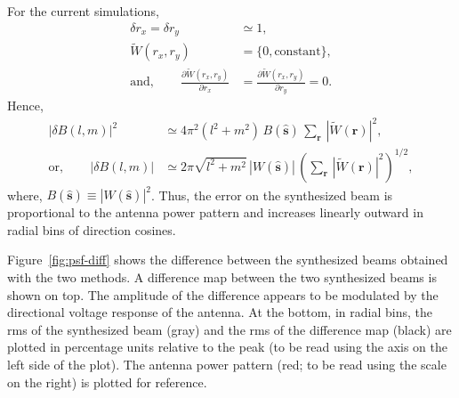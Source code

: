 \documentclass[a4paper,fleqn,usenatbib]{../mnras}
\begin{document}
For the current simulations, 
\begin{align}
  \delta r_x = \delta r_y &\simeq 1, \\
  \widetilde{W}(r_x,r_y) &= \{0, \textrm{constant}\}, \\
  \textrm{and},\qquad \frac{\partial{\widetilde{W}(r_x,r_y)}}{\partial{r_x}} &= \frac{\partial{\widetilde{W}(r_x,r_y)}}{\partial{r_y}} = 0.
\end{align}
Hence,
\begin{align}
  \left|\delta B(l,m)\right|^2 &\simeq 4\pi^2\left(l^2+m^2\right)\,B(\hat{\mathbf{s}})\,\sum_\mathbf{r}\,\left|\widetilde{W}(\mathbf{r})\right|^2, \\
\textrm{or},\qquad \left|\delta B(l,m)\right| &\simeq 2\pi\sqrt{l^2+m^2}\,\left|W(\hat{\mathbf{s}})\right|\,\left(\sum_\mathbf{r}\,\left|\widetilde{W}(\mathbf{r})\right|^2\right)^{1/2}, \label{eqn:syn-beam-error}
\end{align}
where, $B(\hat{\mathbf{s}}) \equiv \left|W(\hat{\mathbf{s}})\right|^2$. Thus, 
the error on the synthesized beam is proportional to the antenna power pattern
and increases linearly outward in radial bins of direction cosines.

Figure~\ref{fig:psf-diff} shows the difference between the synthesized beams 
obtained with the two methods. A difference map between the two synthesized 
beams is shown on top. The amplitude of the difference appears to be 
modulated by the directional voltage response of the antenna. At the bottom, 
in radial bins, the rms of the synthesized beam (gray) and the rms of the 
difference map (black) are plotted in percentage units relative to the peak 
(to be read using the axis on the left side of the plot). The antenna power 
pattern (red; to be read using the scale on the right) is plotted for reference. 
\end{document}
